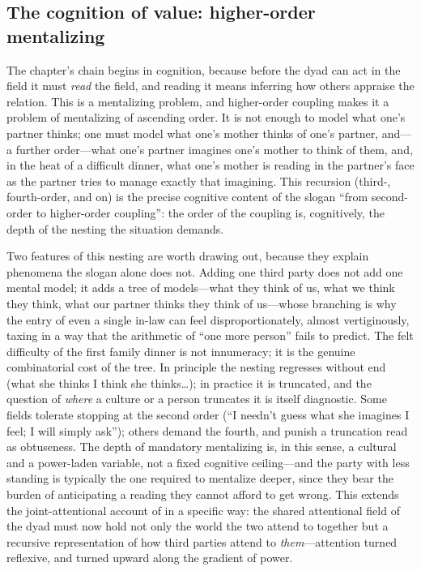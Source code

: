 \subsection{The cognition of value: higher-order mentalizing}
The chapter's chain begins in cognition, because before the dyad can act in the field it must \emph{read} the field, and reading it means inferring how others appraise the relation. This is a mentalizing problem, and higher-order coupling makes it a problem of  mentalizing of ascending order. It is not enough to model what one's partner thinks; one must model what one's mother thinks of one's partner, and---a further order---what one's partner imagines one's mother to think of them, and, in the heat of a difficult dinner, what one's mother is reading in the partner's face as the partner tries to manage exactly that imagining. This recursion (third-, fourth-order, and on) is the precise cognitive content of the slogan ``from second-order to higher-order coupling'': the order of the coupling is, cognitively, the depth of the nesting the situation demands.

Two features of this nesting are worth drawing out, because they explain phenomena the slogan alone does not.  Adding one third party does not add one mental model; it adds a tree of models---what they think of us, what we think they think, what our partner thinks they think of us---whose branching is why the entry of even a single in-law can feel disproportionately, almost vertiginously, taxing in a way that the arithmetic of ``one more person'' fails to predict. The felt difficulty of the first family dinner is not innumeracy; it is the genuine combinatorial cost of the tree.  In principle the nesting regresses without end (what she thinks I think she thinks\ldots); in practice it is truncated, and the question of \emph{where} a culture or a person truncates it is itself diagnostic. Some fields tolerate stopping at the second order (``I needn't guess what she imagines I feel; I will simply ask''); others demand the fourth, and punish a truncation read as obtuseness. The depth of mandatory mentalizing is, in this sense, a cultural and a power-laden variable, not a fixed cognitive ceiling---and the party with less standing is typically the one required to mentalize deeper, since they bear the burden of anticipating a reading they cannot afford to get wrong. This extends the joint-attentional account of  in a specific way: the shared attentional field of the dyad must now hold not only the world the two attend to together but a recursive representation of how third parties attend to \emph{them}---attention turned reflexive, and turned upward along the gradient of power.

